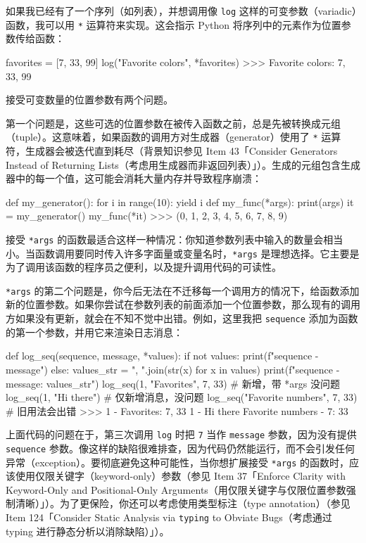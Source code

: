 如果我已经有了一个序列（如列表），并想调用像 \texttt{log} 这样的可变参数（variadic）函数，我可以用 \texttt{*} 运算符来实现。这会指示 Python 将序列中的元素作为位置参数传给函数：

\begin{codebox}[python]
favorites = [7, 33, 99]
log("Favorite colors", *favorites)
>>>
Favorite colors: 7, 33, 99
\end{codebox}

接受可变数量的位置参数有两个问题。

第一个问题是，这些可选的位置参数在被传入函数之前，总是先被转换成元组（tuple）。这意味着，如果函数的调用方对生成器（generator）使用了 \texttt{*} 运算符，生成器会被迭代直到耗尽（背景知识参见 Item 43「Consider Generators Instead of Returning Lists（考虑用生成器而非返回列表）」）。生成的元组包含生成器中的每一个值，这可能会消耗大量内存并导致程序崩溃：

\begin{codebox}[python]
def my_generator():
    for i in range(10):
        yield i
def my_func(*args):
    print(args)
it = my_generator()
my_func(*it)
>>>
(0, 1, 2, 3, 4, 5, 6, 7, 8, 9)
\end{codebox}

接受 \texttt{*args} 的函数最适合这样一种情况：你知道参数列表中输入的数量会相当小。当函数调用要同时传入许多字面量或变量名时，\texttt{*args} 是理想选择。它主要是为了调用该函数的程序员之便利，以及提升调用代码的可读性。

\texttt{*args} 的第二个问题是，你今后无法在不迁移每一个调用方的情况下，给函数添加新的位置参数。如果你尝试在参数列表的前面添加一个位置参数，那么现有的调用方如果没有更新，就会在不知不觉中出错。例如，这里我把 \texttt{sequence} 添加为函数的第一个参数，并用它来渲染日志消息：

\begin{codebox}[python]
def log_seq(sequence, message, *values):
    if not values:
        print(f"{sequence} - {message}")
    else:
        values_str = ", ".join(str(x) for x in values)
        print(f"{sequence} - {message}: {values_str}")
log_seq(1, "Favorites", 7, 33)      # 新增，带 *args 没问题
log_seq(1, "Hi there")              # 仅新增消息，没问题
log_seq("Favorite numbers", 7, 33)  # 旧用法会出错
>>>
1 - Favorites: 7, 33
1 - Hi there
Favorite numbers - 7: 33
\end{codebox}

上面代码的问题在于，第三次调用 \texttt{log} 时把 \texttt{7} 当作 \texttt{message} 参数，因为没有提供 \texttt{sequence} 参数。像这样的缺陷很难排查，因为代码仍然能运行，而不会引发任何异常（exception）。要彻底避免这种可能性，当你想扩展接受 \texttt{*args} 的函数时，应该使用仅限关键字（keyword-only）参数（参见 Item 37「Enforce Clarity with Keyword-Only and Positional-Only Arguments（用仅限关键字与仅限位置参数强制清晰）」）。为了更保险，你还可以考虑使用类型标注（type annotation）（参见 Item 124「Consider Static Analysis via \texttt{typing} to Obviate Bugs（考虑通过 typing 进行静态分析以消除缺陷）」）。

